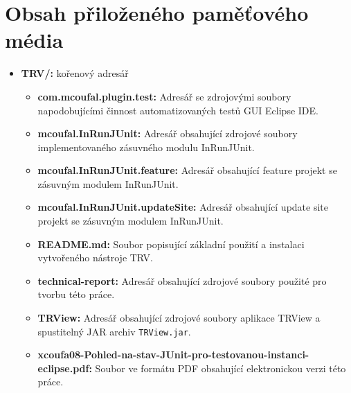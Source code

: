 \chapter{Obsah přiloženého paměťového média}
\label{jak}

\begin{itemize}
 \item {\LARGE \textbf{TRV/:} kořenový adresář}
    {\Large \begin{itemize}
     \item \textbf{com.mcoufal.plugin.test:}
	Adresář se zdrojovými soubory napodobujícími činnost automatizovaných testů GUI Eclipse IDE.
     \item \textbf{mcoufal.InRunJUnit:}
	Adresář obsahující zdrojové soubory implementovaného zásuvného modulu InRunJUnit.
     \item \textbf{mcoufal.InRunJUnit.feature:}
	Adresář obsahující feature projekt se zásuvným modulem InRunJUnit.
     \item \textbf{mcoufal.InRunJUnit.updateSite:}
	Adresář obsahující update site projekt se zásuvným modulem InRunJUnit.
     \item \textbf{README.md:}
	Soubor popisující základní použití a instalaci vytvořeného nástroje TRV.
     \item \textbf{technical-report:}
	Adresář obsahující zdrojové soubory použité pro tvorbu této práce.
     \item \textbf{TRView:}
	Adresář obsahující zdrojové soubory aplikace TRView a spustitelný JAR archiv \texttt{TRView.jar}.
     \item \textbf{xcoufa08-Pohled-na-stav-JUnit-pro-testovanou-instanci-eclipse.pdf:}
	Soubor ve formátu PDF obsahující elektronickou verzi této práce.
    \end{itemize}}
\end{itemize}


